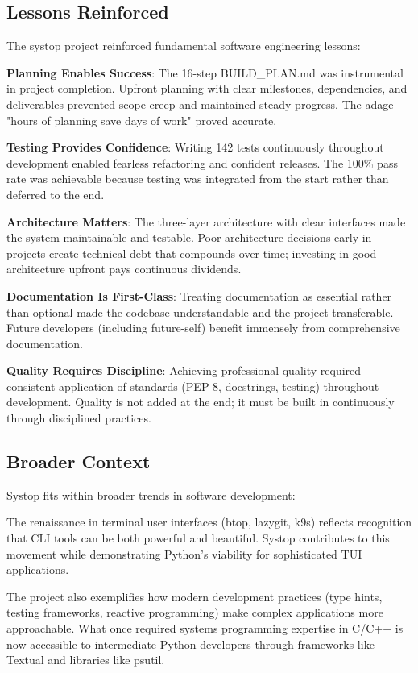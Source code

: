 \documentclass[12pt,a4paper,oneside]{report}
\begin{document}
\subsection{Lessons Reinforced}

The systop project reinforced fundamental software engineering lessons:

\textbf{Planning Enables Success}: The 16-step BUILD\_PLAN.md was instrumental in project completion. Upfront planning with clear milestones, dependencies, and deliverables prevented scope creep and maintained steady progress. The adage "hours of planning save days of work" proved accurate.

\textbf{Testing Provides Confidence}: Writing 142 tests continuously throughout development enabled fearless refactoring and confident releases. The 100\% pass rate was achievable because testing was integrated from the start rather than deferred to the end.

\textbf{Architecture Matters}: The three-layer architecture with clear interfaces made the system maintainable and testable. Poor architecture decisions early in projects create technical debt that compounds over time; investing in good architecture upfront pays continuous dividends.

\textbf{Documentation Is First-Class}: Treating documentation as essential rather than optional made the codebase understandable and the project transferable. Future developers (including future-self) benefit immensely from comprehensive documentation.

\textbf{Quality Requires Discipline}: Achieving professional quality required consistent application of standards (PEP 8, docstrings, testing) throughout development. Quality is not added at the end; it must be built in continuously through disciplined practices.

\subsection{Broader Context}

Systop fits within broader trends in software development:

The renaissance in terminal user interfaces (btop, lazygit, k9s) reflects recognition that CLI tools can be both powerful and beautiful. Systop contributes to this movement while demonstrating Python's viability for sophisticated TUI applications.

The project also exemplifies how modern development practices (type hints, testing frameworks, reactive programming) make complex applications more approachable. What once required systems programming expertise in C/C++ is now accessible to intermediate Python developers through frameworks like Textual and libraries like psutil.
\end{document}
